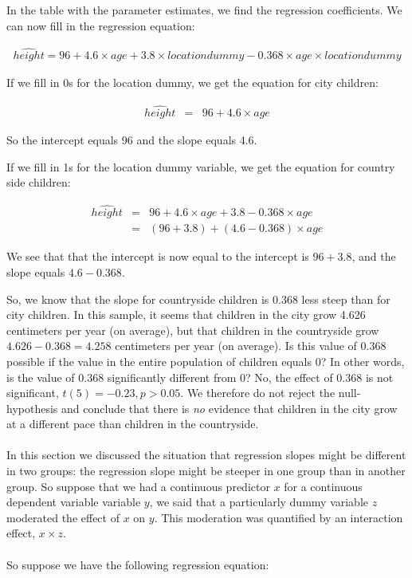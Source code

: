 \documentclass[]{report}\usepackage[]{graphicx}\usepackage[]{color}
\begin{document}
In the table with the parameter estimates, we find the regression coefficients. We can now fill in the regression equation:

\begin{eqnarray} 
\widehat{height} = 96 + 4.6 \times age + 3.8  \times locationdummy - 0.368 \times  age \times locationdummy  \nonumber
\end{eqnarray}


If we fill in 0s for the location dummy, we get the equation for city children:

\begin{eqnarray} 
\widehat{height} &=& 96 + 4.6  \times age    \nonumber
 \end{eqnarray}

So the intercept equals 96 and the slope equals 4.6.

If we fill in 1s for the location dummy variable, we get the equation for country side children:

\begin{eqnarray} 
\widehat{height} &=& 96 + 4.6  \times age + 3.8   - 0.368  \times age  \\ \nonumber
      &=& (96+ 3.8) + (4.6 - 0.368) \times age    \nonumber
 \end{eqnarray}

We see that that the intercept is now equal to the intercept is $96+ 3.8$, and the slope equals $4.6-0.368$. 

So, we know that the slope for countryside children is 0.368 less steep than for city children. In this sample, it seems that children in the city grow 4.626 centimeters per year (on average), but that children in the countryside grow $4.626-0.368= 4.258$ centimeters per year (on average). Is this value of 0.368 possible if the value in the entire population of children equals 0? In other words, is the value of 0.368 significantly different from 0? No, the effect of 0.368 is not significant, $t(5)=-0.23, p>0.05$. We therefore do not reject the null-hypothesis and conclude that there is \textit{no} evidence that children in the city grow at a different pace than children in the countryside.\\
\\
In this section we discussed the situation that regression slopes might be different in two groups: the regression slope might be steeper in one group than in another group. So suppose that we had a continuous predictor $x$ for a continuous dependent variable variable $y$, we said that a particularly dummy variable $z$ moderated the effect of $x$ on $y$. This moderation was quantified by an interaction effect, $x \times z$.
\\
\\
So suppose we have the following regression equation:
\end{document}
